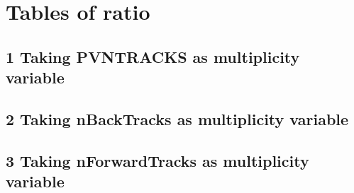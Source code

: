 \section{Tables of ratio}
\label{sec:ResultTables}
\subsection*{1 Taking PVNTRACKS as multiplicity variable} 





\subsection*{2 Taking nBackTracks as multiplicity variable} 





\subsection*{3 Taking nForwardTracks as multiplicity variable} 





\clearpage

